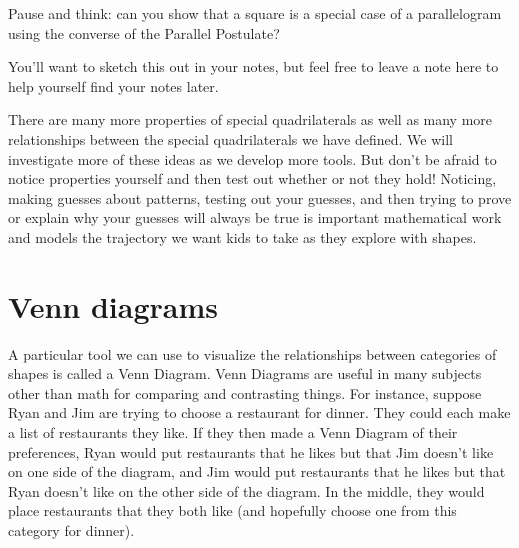 \documentclass{ximera}
\begin{document}
\begin{question}
Pause and think: can you show that a square is a special case of a parallelogram using the converse of the Parallel Postulate?
\begin{freeResponse}
You'll want to sketch this out in your notes, but feel free to leave a note here to help yourself find your notes later.
\end{freeResponse}
\end{question}


There are many more properties of special quadrilaterals as well as many more relationships between the special 
quadrilaterals we have defined. We will investigate more of these ideas as we develop more tools. But don't be 
afraid to notice properties yourself and then test out whether or not they hold! Noticing, making guesses about 
patterns, testing out your guesses, and then trying to prove or explain why your guesses will always be true is 
important mathematical work and models the trajectory we want kids to take as they explore with shapes.

\section{Venn diagrams}

A particular tool we can use to visualize the relationships between categories of shapes is called a Venn Diagram. 
Venn Diagrams are useful in many subjects other than math for comparing and contrasting things. For instance, 
suppose Ryan and Jim are trying to choose a restaurant for dinner. They could each make a list of restaurants they 
like. If they then made a Venn Diagram of their preferences, Ryan would put restaurants that he likes but that Jim 
doesn't like on one side of the diagram, and Jim would put restaurants that he likes but that Ryan doesn't like 
on the other side of the diagram. In the middle, they would place restaurants that they both like (and hopefully 
choose one from this category for dinner).

\begin{image}
\end{image}
\end{document}
